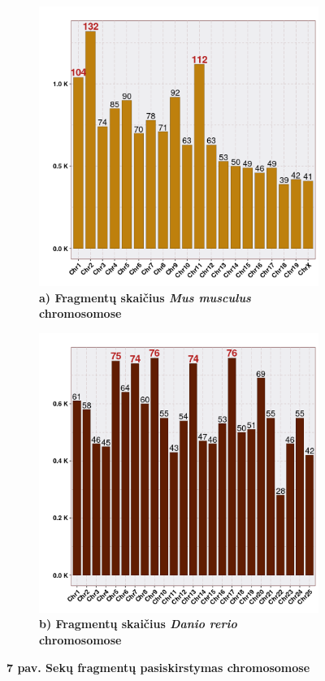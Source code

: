 \documentclass[12pt]{article}
\begin{document}
\begin{figure}[htb]
    \centering
    \begin{subfigure}[b]{0.45\textwidth}
        \centering
        \includegraphics[width=\textwidth]{../Figures/Synteny_Chr_MM.png}
        \caption*{\centering\small\textbf{a) Fragmentų skaičius \emph{Mus musculus} chromosomose}}
    \end{subfigure}
    \hfill
    \begin{subfigure}[b]{0.45\textwidth}
        \centering
        \includegraphics[width=\textwidth]{../Figures/Synteny_Chr_DR.png}
        \caption*{\centering\small\textbf{b) Fragmentų skaičius \emph{Danio rerio} chromosomose}}
    \end{subfigure}
    \caption*{\small\textbf{7 pav. Sekų fragmentų pasiskirstymas chromosomose}}
    \label{fig:birds}
\end{figure}
\end{document}
